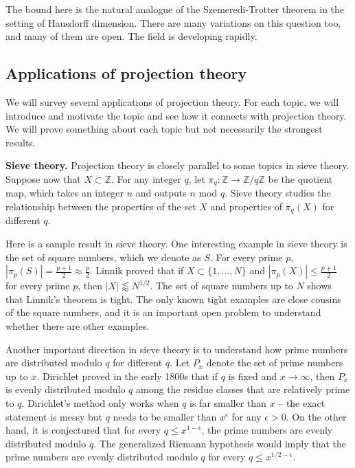 \documentclass[12pt]{amsart}
\newcommand{\ZZ}{\mathbb{Z}}
\begin{document}
The bound here is the natural analogue of the Szemeredi-Trotter theorem in the setting of Hausdorff dimension.   There are many variations on this question too,  and many of them are open.  The field is developing rapidly.

\subsection{Applications of projection theory}

We will survey several applications of projection theory.   For each topic,  we will introduce and motivate the topic and see how it connects with projection theory.   We will prove something about each topic but not necessarily the strongest results.

\vskip10pt

{\bf Sieve theory.} Projection theory is closely parallel to some topics in sieve theory.   Suppose now that $X \subset \ZZ$.   For any integer $q$,  let $\pi_q: \ZZ \rightarrow \ZZ / q \ZZ$ be the quotient map,  which takes an integer $n$ and outputs $n$ mod $q$.   Sieve theory studies the relationship between the properties of the set $X$ and properties of $\pi_q(X)$ for different $q$.    

Here is a sample result in sieve theory.    One interesting example in sieve theory is the set of square numbers,  which we denote as $S$.     For every prime $p$,  $|\pi_p(S)| = \frac{p+1}{2} \approx \frac{p}{2}$.   Linnik proved that if $X \subset \{1, ... , N\}$ and $|\pi_p(X)| \le \frac{p+1}{2}$ for every prime $p$,  then $|X| \lessapprox N^{1/2}$.   The set of square numbers up to $N$ shows that Linnik's theorem is tight.   The only known tight examples are close cousins of the square numbers,  and it is an important open problem to understand whether there are other examples. 

Another important direction in sieve theory is to understand how prime numbers are distributed modulo $q$ for different $q$.   Let $P_x$ denote the set of prime numbers up to $x$.   Dirichlet proved in the early 1800s that if $q$ is fixed and $x \rightarrow \infty$,  then $P_x$ is evenly distributed modulo $q$ among the residue classes that are relatively prime to $q$.  Dirichlet's method only works when $q$ is far smaller than $x$ -- the exact statement is messy but $q$ needs to be smaller than $x^\epsilon$ for any $\epsilon > 0$.   On the other hand,  it is conjectured that for every $q \le x^{1 - \epsilon}$,  the prime numbers are evenly distributed modulo $q$.   The generalized Riemann hypothesis would imply that the prime numbers are evenly distributed modulo $q$ for every $q \le x^{1/2 - \epsilon}$.
\end{document}

